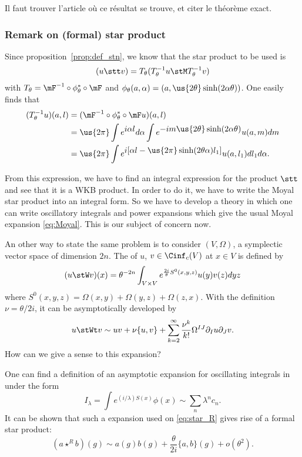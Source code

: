 \begin{probleme}
	Il faut trouver l'article où ce résultat se trouve, et citer le théorème exact.
	\label{ProbEnonSLdef}
\end{probleme}

\subsubsection{Remark on (formal) star product}\label{subsec:rem_on_sp}

Since proposition~\ref{prop:def_stn}, we know that the star product to be used is
\[
	(u\stt v)=T_{\theta}(T_{\theta}^{-1} u\stM T_{\theta}^{-1} v)
\]
with $T_{\theta}=\mF^{-1}\circ\phi^*_{\theta}\circ\mF$ and $\phi_{\theta}(a,\alpha)=(a,\us{2\theta}\sinh(2\alpha\theta))$. One easily finds that
\begin{equation}
	\begin{split}
		(T^{-1}_{\theta} u)(a,l)&=(\mF^{-1}\circ\phi^*_{\theta}\circ\mF u)(a,l)\\
		&=\us{2\pi}\int e^{\displaystyle i\alpha l}d\alpha\int
		e^{\displaystyle-im\us{2\theta}\sinh(2\alpha\theta)}u(a,m)dm\\
		&=\us{2\pi}\int
		e^{\displaystyle i[\alpha l-\us{2\pi}\sinh(2\theta\alpha)l_1] }
		u(a,l_1)dl_1d\alpha.
	\end{split}
\end{equation}

From this expression, we have to find an integral expression for the product $\stt$ and see that it is a WKB product. In order to do it, we have to write the Moyal star product into an integral form. So we have to develop a theory in which one can write oscillatory integrals and power expansions which give the usual Moyal expansion \eqref{eq:Moyal}. This is our subject of concern now.

An other way to state the same problem is to consider $(V,\Omega)$, a symplectic vector space of dimension $2n$. The  of $u$, $v\in\Cinf_c(V)$ at $x\in V$ is defined by
\[
	(u\stW v)(x)=\theta^{-2n}\int_{V\times V}e^{\frac{2i}{\theta}S^0(x,y,z)}u(y)v(z)dyz
\]
where $S^0(x,y,z)=\Omega(x,y)+\Omega(y,z)+\Omega(z,x)$. With the
definition  $\nu=\theta/2i$, it can be asymptotically developed by
\[
	u\stWt v\sim uv+\nu\{u,v\}+\sum_{k=2}^{\infty}\frac{\nu^k}{k!}\Omega^{IJ}\partial_Iu\partial_Jv.
\]
How can we give a sense to this expansion?

One can  find a definition of an asymptotic expansion for oscillating integrals in \cite{Dieu7} under the form
\[
	I_{\lambda}=\int e^{(i/\lambda)S(x)}\phi(x)\sim\sum_n\lambda^nc_n.
\]
It can be shown that such a  expansion used on \eqref{eq:star_R} gives rise of a formal star product:
\begin{equation}    \label{EqDevFedFor}
	(a\star^{R} b)(g)\sim a(g)b(g)+\frac{\theta}{2i}\{a,b\}(g)+o(\theta^2).
\end{equation}

